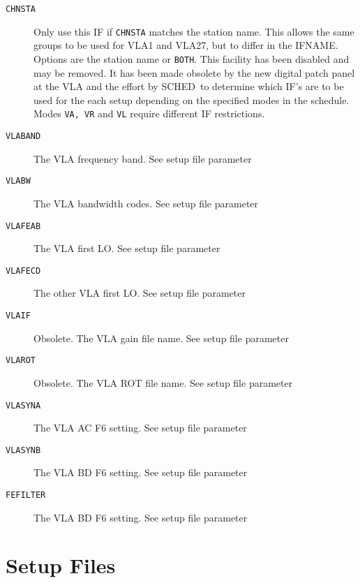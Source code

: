 \documentclass{report}
\newcommand{\schedb}{{\sc SCHED~}}
\begin{document}
\begin{description}
\item [{\tt CHNSTA}]  Only use this IF if {\tt CHNSTA} matches the
station name.  This allows the same groups to be used for VLA1 and
VLA27, but to differ in the IFNAME.  Options are the station name
or {\tt BOTH}.  This facility has been disabled and may be removed.
It has been made obsolete by the new digital patch panel at the VLA
and the effort by \schedb to determine which IF's are to be used for
the each setup depending on the specified modes in the schedule.
Modes {\tt VA, VR} and {\tt VL} require different IF restrictions.

\item [{\tt VLABAND}] The VLA frequency band.  See setup file parameter

\item [{\tt VLABW}] The VLA bandwidth codes.  See setup file parameter

\item [{\tt VLAFEAB}] The VLA first LO.  See setup file parameter

\item [{\tt VLAFECD}] The other VLA first LO.  See setup file parameter

\item [{\tt VLAIF}] Obsolete.  The VLA gain file name.
See setup file parameter 

\item [{\tt VLAROT}] Obsolete.  The VLA ROT file name.
See setup file parameter 

\item [{\tt VLASYNA}] The VLA AC F6 setting.  See setup file parameter

\item [{\tt VLASYNB}]The VLA BD F6 setting.  See setup file parameter

\item [{\tt FEFILTER}]The VLA BD F6 setting.  See setup file parameter

\end{description}



\section{\label{SEC:SETUPS}Setup Files}
\end{document}
